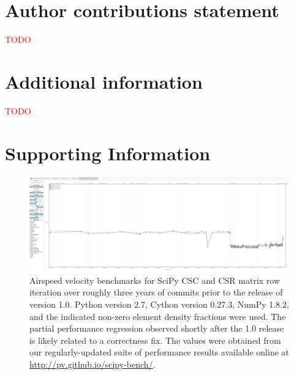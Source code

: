 \documentclass[fleqn,10pt]{wlscirep}
\newcommand{\fixme}[1]{\textcolor{red}{{#1}}}
\begin{document}
\section*{Author contributions statement}

\fixme{TODO}


\section*{Additional information}

\fixme{TODO}

\section*{Supporting Information}

\renewcommand{\thefigure}{S\arabic{figure}}
\setcounter{figure}{0}

\begin{figure}[H]
\centering
\includegraphics[width=\textwidth]{supporting_info/asv_bench/sparse/sparse_iteration_bench}
\caption{Airspeed velocity benchmarks for SciPy CSC and CSR matrix row iteration over roughly three years of commits prior to the release of version 1.0. Python version 2.7, Cython version 0.27.3, NumPy 1.8.2, and the indicated non-zero element density fractions were used. The partial performance regression observed shortly after the 1.0 release is likely related to a correctness fix\cite{sparse-regress}. The values were obtained from our regularly-updated suite of performance results available online at \url{http://pv.github.io/scipy-bench/}.}
\label{fig:sparse-iter}
\end{figure}
\end{document}
